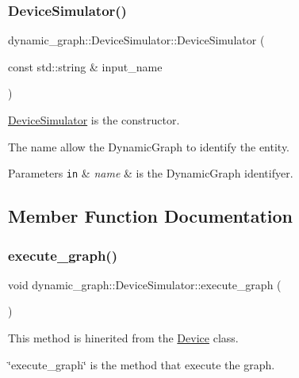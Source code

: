 \subsubsection{\texorpdfstring{Device\+Simulator()}{DeviceSimulator()}}
{\footnotesize\ttfamily dynamic\+\_\+graph\+::\+Device\+Simulator\+::\+Device\+Simulator (\begin{DoxyParamCaption}\item[{const std\+::string \&}]{input\+\_\+name }\end{DoxyParamCaption})}



\hyperlink{classdynamic__graph_1_1DeviceSimulator}{Device\+Simulator} is the constructor. 

The name allow the Dynamic\+Graph to identify the entity. 
\begin{DoxyParams}[1]{Parameters}
\mbox{\tt in}  & {\em name} & is the Dynamic\+Graph identifyer. \\
\hline
\end{DoxyParams}


\subsection{Member Function Documentation}
\mbox{\label{classdynamic__graph_1_1DeviceSimulator_a614c51ee8d55765019ae98715f875ed5}} 
\subsubsection{\texorpdfstring{execute\+\_\+graph()}{execute\_graph()}}
{\footnotesize\ttfamily void dynamic\+\_\+graph\+::\+Device\+Simulator\+::execute\+\_\+graph (\begin{DoxyParamCaption}{ }\end{DoxyParamCaption})\hspace{0.3cm}{\ttfamily [virtual]}}



This method is hinerited from the \hyperlink{classdynamic__graph_1_1Device}{Device} class. 

\char`\"{}execute\+\_\+graph\char`\"{} is the method that execute the graph.

